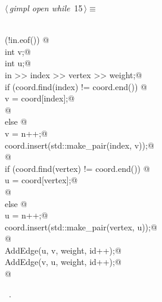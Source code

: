 \documentclass[12pt]{article}
\begin{document}
\begin{flushleft} \small
\begin{minipage}{\linewidth}\label{scrap24}\raggedright\small
{} $\langle\,${\itshape gimpl open while}\nobreak\ {\footnotesize {15}}$\,\rangle\equiv$
\vspace{-1ex}
\begin{list}{}{} \item
\mbox{}\verb@@\\
\mbox{}\verb@while (!in.eof()) {@\\
\mbox{}\verb@          int v;@\\
\mbox{}\verb@          int u;@\\
\mbox{}\verb@          in >> index >> vertex >> weight;@\\
\mbox{}\verb@          if (coord.find(index) != coord.end()) {@\\
\mbox{}\verb@              v = coord[index];@\\
\mbox{}\verb@          }@\\
\mbox{}\verb@          else {@\\
\mbox{}\verb@              v = n++;@\\
\mbox{}\verb@              coord.insert(std::make_pair(index, v));@\\
\mbox{}\verb@          }@\\
\mbox{}\verb@          if (coord.find(vertex) != coord.end()) {@\\
\mbox{}\verb@              u = coord[vertex];@\\
\mbox{}\verb@          }@\\
\mbox{}\verb@          else {@\\
\mbox{}\verb@              u = n++;@\\
\mbox{}\verb@              coord.insert(std::make_pair(vertex, u));@\\
\mbox{}\verb@          }@\\
\mbox{}\verb@          AddEdge(u, v, weight, id++);@\\
\mbox{}\verb@          AddEdge(v, u, weight, id++);@\\
\mbox{}\verb@} @\\
\mbox{}\verb@@{\NWsep}
\end{list}
\vspace{-1.5ex}
\footnotesize
\begin{list}{}{\setlength{\itemsep}{-\parsep}\setlength{\itemindent}{-\leftmargin}}
\item \NWtxtMacroRefIn\ .

\item{}
\end{list}
\end{minipage}\vspace{4ex}
\end{flushleft}
\end{document}
